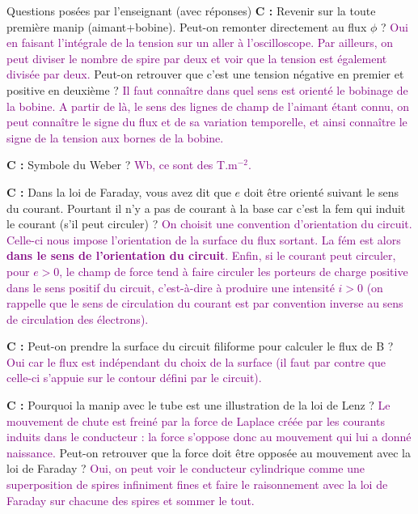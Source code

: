 \begin{reportBlock}{Questions posées par l’enseignant (avec réponses)}
  \textbf{C :} Revenir sur la toute première manip (aimant+bobine). Peut-on remonter directement au flux $\phi$ ? \textcolor{purple}{Oui en faisant l'intégrale de la tension sur un aller à l'oscilloscope. Par ailleurs, on peut diviser le nombre de spire par deux et voir que la tension est également divisée par deux.} Peut-on retrouver que c'est une tension négative en premier et positive en deuxième ? \textcolor{purple}{Il faut connaître dans quel sens est orienté le bobinage de la bobine. A partir de là, le sens des lignes de champ de l'aimant étant connu, on peut connaître le signe du flux et de sa variation temporelle, et ainsi connaître le signe de la tension aux bornes de la bobine.}\newline
  
  \textbf{C :} Symbole du Weber ? \textcolor{purple}{Wb, ce sont des T.m$^{-2}$.}\newline
  
  \textbf{C :} Dans la loi de Faraday, vous avez dit que $e$ doit être orienté suivant le sens du courant. Pourtant il n'y a pas de courant à la base car c'est la fem qui induit le courant (s'il peut circuler) ? \textcolor{purple}{On choisit une convention d'orientation du circuit. Celle-ci nous impose l'orientation de la surface du flux sortant. La fém est alors \textbf{dans le sens de l'orientation du circuit}. Enfin, si le courant peut circuler, pour $e>0$, le champ de force tend à faire circuler les porteurs de charge positive dans le sens positif du circuit, c'est-à-dire à produire une intensité $i>0$ (on rappelle que le sens de circulation du courant est par convention inverse au sens de circulation des électrons).}\newline
  
  \textbf{C :} Peut-on prendre la surface du circuit filiforme pour calculer le flux de B ? \textcolor{purple}{Oui car le flux est indépendant du choix de la surface (il faut par contre que celle-ci s'appuie sur le contour défini par le circuit).}\newline
  
  \textbf{C :} Pourquoi la manip avec le tube est une illustration de la loi de Lenz ? \textcolor{purple}{Le mouvement de chute est freiné par la force de Laplace créée par les courants induits dans le conducteur : la force s'oppose donc au mouvement qui lui a donné naissance.} Peut-on retrouver que la force doit être opposée au mouvement avec la loi de Faraday ? \textcolor{purple}{Oui, on peut voir le conducteur cylindrique comme une superposition de spires infiniment fines et faire le raisonnement avec la loi de Faraday sur chacune des spires et sommer le tout.}  \newline
  

\end{reportBlock}
